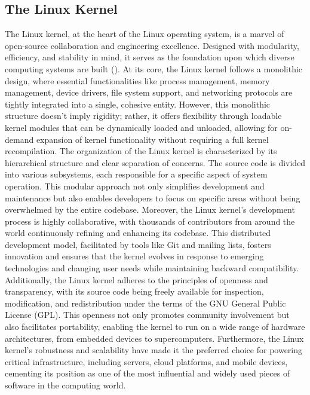 \documentclass[
]{article}
\begin{document}
\begin{multicols}{2}
\section{The Linux Kernel}
The Linux kernel, at the heart of the Linux operating system, is a marvel of open-source collaboration and engineering excellence. Designed with modularity, efficiency, and stability in mind, it serves as the foundation upon which diverse computing systems are built (\cite{tanenbaum2012linux}). At its core, the Linux kernel follows a monolithic design, where essential functionalities like process management, memory management, device drivers, file system support, and networking protocols are tightly integrated into a single, cohesive entity. However, this monolithic structure doesn't imply rigidity; rather, it offers flexibility through loadable kernel modules that can be dynamically loaded and unloaded, allowing for on-demand expansion of kernel functionality without requiring a full kernel recompilation. The organization of the Linux kernel is characterized by its hierarchical structure and clear separation of concerns. The source code is divided into various subsystems, each responsible for a specific aspect of system operation. This modular approach not only simplifies development and maintenance but also enables developers to focus on specific areas without being overwhelmed by the entire codebase. Moreover, the Linux kernel's development process is highly collaborative, with thousands of contributors from around the world continuously refining and enhancing its codebase. This distributed development model, facilitated by tools like Git and mailing lists, fosters innovation and ensures that the kernel evolves in response to emerging technologies and changing user needs while maintaining backward compatibility. Additionally, the Linux kernel adheres to the principles of openness and transparency, with its source code being freely available for inspection, modification, and redistribution under the terms of the GNU General Public License (GPL). This openness not only promotes community involvement but also facilitates portability, enabling the kernel to run on a wide range of hardware architectures, from embedded devices to supercomputers. Furthermore, the Linux kernel's robustness and scalability have made it the preferred choice for powering critical infrastructure, including servers, cloud platforms, and mobile devices, cementing its position as one of the most influential and widely used pieces of software in the computing world.


\end{multicols}
\end{document}
